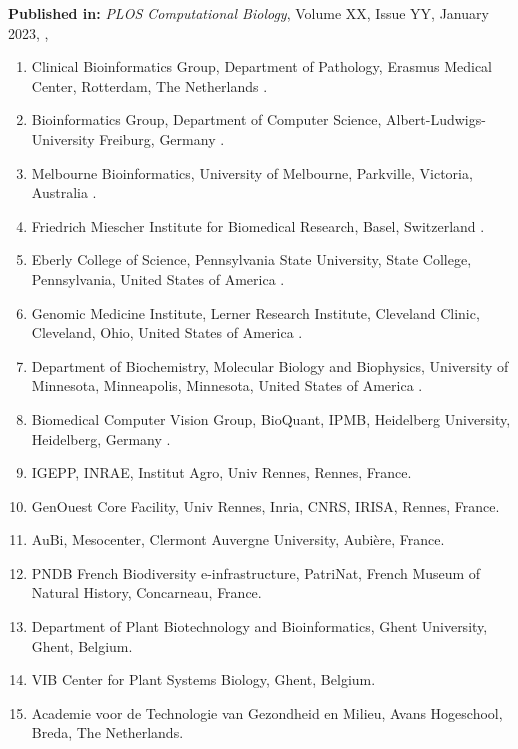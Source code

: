 \textbf{Published in:} \emph{PLOS Computational Biology}, Volume XX, Issue YY, January 2023, ,  \\


\small

\begin{enumerate}
\itemsep-0.5em
\item Clinical Bioinformatics Group, Department of Pathology, Erasmus Medical Center, Rotterdam, The Netherlands .\label{gtn-affil:1}
\item Bioinformatics Group, Department of Computer Science, Albert-Ludwigs-University Freiburg, Germany .\label{gtn-affil:2}
\item Melbourne Bioinformatics, University of Melbourne, Parkville, Victoria, Australia .\label{gtn-affil:3}
\item Friedrich Miescher Institute for Biomedical Research, Basel, Switzerland .\label{gtn-affil:4}
\item Eberly College of Science, Pennsylvania State University, State College, Pennsylvania, United States of America .\label{gtn-affil:5}
\item Genomic Medicine Institute, Lerner Research Institute, Cleveland Clinic, Cleveland, Ohio, United States of America  .\label{gtn-affil:6}
\item Department of Biochemistry, Molecular Biology and Biophysics, University of Minnesota, Minneapolis, Minnesota, United States of America  .\label{gtn-affil:7}
\item Biomedical Computer Vision Group, BioQuant, IPMB, Heidelberg University, Heidelberg, Germany .\label{gtn-affil:8}
\item IGEPP, INRAE, Institut Agro, Univ Rennes, Rennes, France.\label{gtn-affil:9}
\item GenOuest Core Facility, Univ Rennes, Inria, CNRS, IRISA, Rennes, France.\label{gtn-affil:10}
\item AuBi, Mesocenter, Clermont Auvergne University, Aubière, France.\label{gtn-affil:11}
\item PNDB French Biodiversity e-infrastructure, PatriNat, French Museum of Natural History, Concarneau, France.\label{gtn-affil:12}
\item Department of Plant Biotechnology and Bioinformatics, Ghent University, Ghent, Belgium.\label{gtn-affil:13}
\item VIB Center for Plant Systems Biology, Ghent, Belgium.\label{gtn-affil:14}
\item Academie voor de Technologie van Gezondheid en Milieu, Avans Hogeschool, Breda, The Netherlands.\label{gtn-affil:15}

\end{enumerate}
